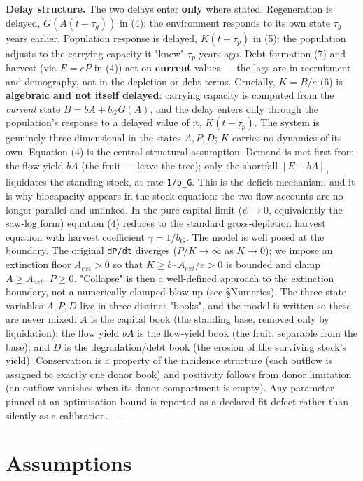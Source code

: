 \documentclass[11pt]{article}
\begin{document}
\textbf{Delay structure.} The two delays enter \textbf{only} where stated. Regeneration is delayed, $G(A(t-\tau{}_{g}))$ in (4): the environment responds to its own state $\tau{}_{g}$ years earlier. Population response is delayed, $K(t-\tau{}_{p})$ in (5): the population adjusts to the carrying capacity it "knew" $\tau{}_{p}$ years ago. Debt formation (7) and harvest (via $E = eP$ in (4)) act on \textbf{current} values — the lags are in recruitment and demography, not in the depletion or debt terms. Crucially, $K = B/e$ (6) is \textbf{algebraic and not itself delayed}: carrying capacity is computed from the \emph{current} state $B = bA + b_{G} G(A)$, and the delay enters only through the population's response to a delayed value of it, $K(t-\tau{}_{p})$. The system is genuinely three-dimensional in the states $A, P, D$; $K$ carries no dynamics of its own. Equation (4) is the central structural assumption. Demand is met first from the flow yield $bA$ (the fruit — leave the tree); only the shortfall $[E - bA]_{+}$ liquidates the standing stock, at rate \texttt{1/b\_G}. This is the deficit mechanism, and it is why biocapacity appears in the stock equation: the two flow accounts are no longer parallel and unlinked. In the pure-capital limit ($\psi{} \to{} 0$, equivalently the saw-log form) equation (4) reduces to the standard gross-depletion harvest equation with harvest coefficient $\gamma{} = 1/b_{G}$. The model is well posed at the boundary. The original \texttt{dP/dt} diverges ($P/K \to{} \infty{}$ as $K \to{} 0$); we impose an extinction floor $A_{ext} > 0$ so that $K \geq{} b\cdot{}A_{ext}/e > 0$ is bounded and clamp $A \geq{} A_{ext}$, $P \geq{} 0$. "Collapse" is then a well-defined approach to the extinction boundary, not a numerically clamped blow-up (see §Numerics). The three state variables $A, P, D$ live in three distinct "books", and the model is written so these are never mixed: $A$ is the capital book (the standing base, removed only by liquidation); the flow yield $bA$ is the flow-yield book (the fruit, separable from the base); and $D$ is the degradation/debt book (the erosion of the surviving stock's yield). Conservation is a property of the incidence structure (each outflow is assigned to exactly one donor book) and positivity follows from donor limitation (an outflow vanishes when its donor compartment is empty). Any parameter pinned at an optimisation bound is reported as a declared fit defect rather than silently as a calibration. ---

\section{Assumptions}
\end{document}
